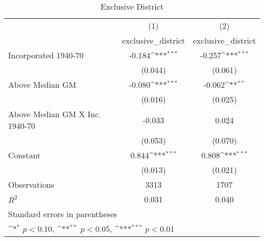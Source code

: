 \begin{table}[htbp]\centering
\def\sym#1{\ifmmode^{#1}\else\(^{#1}\)\fi}
\caption{Exclusive District}
\begin{tabular}{l*{2}{c}}
\hline\hline
                    &\multicolumn{1}{c}{(1)}&\multicolumn{1}{c}{(2)}\\
                    &\multicolumn{1}{c}{exclusive\_district}&\multicolumn{1}{c}{exclusive\_district}\\
\hline
Incorporated 1940-70&      -0.184\sym{***}&      -0.257\sym{***}\\
                    &     (0.044)         &     (0.061)         \\
[1em]
Above Median GM     &      -0.080\sym{***}&      -0.062\sym{**} \\
                    &     (0.016)         &     (0.025)         \\
[1em]
Above Median GM X Inc. 1940-70&      -0.033         &       0.024         \\
                    &     (0.053)         &     (0.070)         \\
[1em]
Constant            &       0.844\sym{***}&       0.808\sym{***}\\
                    &     (0.013)         &     (0.021)         \\
\hline
Observations        &        3313         &        1707         \\
\(R^{2}\)           &       0.031         &       0.040         \\
\hline\hline
\multicolumn{3}{l}{\footnotesize Standard errors in parentheses}\\
\multicolumn{3}{l}{\footnotesize \sym{*} \(p<0.10\), \sym{**} \(p<0.05\), \sym{***} \(p<0.01\)}\\
\end{tabular}
\end{table}
